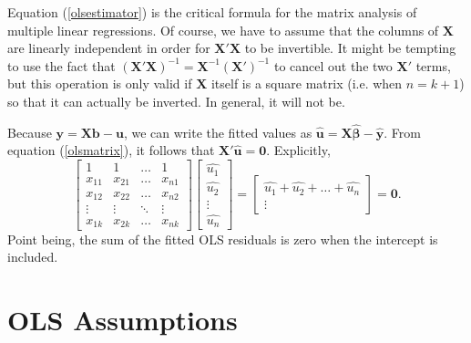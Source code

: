 \documentclass[12pt]{article}
\renewcommand{\vec}[1]{\mathbf{#1}}
\renewcommand{\hat}[1]{\widehat{#1}}
\theoremstyle{definition}
\begin{document}
Equation (\ref{olsestimator}) is the critical formula for the matrix analysis of multiple linear regressions. Of course, we have to assume that the columns of $\vec{X}$ are linearly independent in order for $\vec{X'X}$ to be invertible. It might be tempting to use the fact that $(\vec{X'X})^{-1}=\vec{X}^{-1} ( \vec{X}')^{-1}$ to cancel out the two $\vec{X}'$ terms, but this operation is only valid if $\vec{X}$ itself is a square matrix (i.e. when $n=k+1$) so that it can actually be inverted. In general, it will not be. 

Because $\vec{y}=\vec{Xb - u}$, we can write the fitted values as $\vec{\hat{u}}=\vec{X \hat{\bm{\beta}} - \hat{y}}$. From equation (\ref{olsmatrix}), it follows that $\vec{X'}\hat{\vec{u}}=\vec{0}$. Explicitly,
\[
	\begin{bmatrix}
		1 		& 1 		& \hdots 	& 1\\
		x_{11} 	& x_{21} 	& \hdots 	&	x_{n1}\\
		x_{12} 	& x_{22} 	&\hdots 	&	x_{n2}\\
		\vdots  	& \vdots	&\ddots 	&	\vdots\\
		x_{1k} 	& x_{2k}	& \hdots	&	x_{nk}
	\end{bmatrix}
	\begin{bmatrix}
		\hat{u_1} \\ \hat{u_2} \\ \vdots \\ \hat{u_n}
	\end{bmatrix}=
	\begin{bmatrix}
		\hat{u_1} + \hat{u_2} + \hdots + \hat{u_n} \\
		\vdots
	\end{bmatrix}=\vec{0}.		
\]
Point being, the sum of the fitted OLS residuals is zero when the intercept is included. 




\section{OLS Assumptions}
\end{document}
